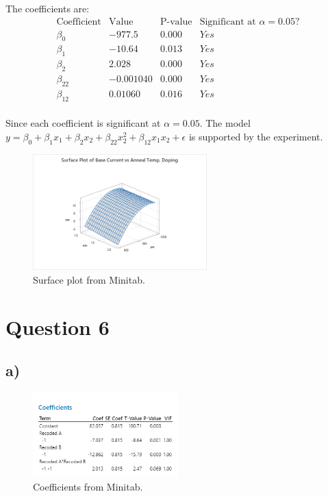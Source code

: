 \documentclass{article}
\begin{document}
The coefficients are:
\begin{equation*}
    \begin{array}{c|c|c|c}
        \text{Coefficient} &\text{Value} &\text{P-value} &\text{Significant at } \alpha = 0.05\text{?}\\
        \hline
        \beta_0  & -977.5     & 0.000 & Yes\\
        \beta_1  & -10.64     & 0.013 & Yes\\
        \beta_2  & 2.028      & 0.000 & Yes\\
        \beta_22 & -0.001040  & 0.000 & Yes\\
        \beta_12 & 0.01060    & 0.016 & Yes
    
    \end{array}
    \end{equation*}\\

Since each coefficient is significant at $\alpha = 0.05$.
The model $y = \beta_0 + \beta_1 x_1 + \beta_2 x_2 + \beta_{22} x^{2}_2 + \beta_{12} x_1 x_2 + \epsilon$ is supported by the experiment.

\begin{figure}[h]
    \centering
    \includegraphics[width=0.6\textwidth]{./images/5_d.png}
    \caption{Surface plot from Minitab.}
    \label{fig:3_b_2}
\end{figure}

\section*{Question 6}

\subsection*{a)}
\begin{figure}[h]
    \centering
    \includegraphics[width=0.5\textwidth]{./images/6_a_1.png}
    \caption{Coefficients from Minitab.}
    \label{fig:3_b_2}
\end{figure}
\end{document}
